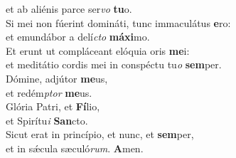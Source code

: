 \oddverse et ab aliénis parce ser\textit{vo} \textbf{tu}o.\\
\evenverse Si mei non fúerint domináti, tunc immaculátus \textbf{e}ro:~\*\\
\evenverse et emundábor a delí\textit{cto} \textbf{má}\textbf{xi}mo.\\
\oddverse Et erunt ut compláceant elóquia oris \textbf{me}i:~\*\\
\oddverse et meditátio cordis mei in conspéctu tu\textit{o} \textbf{sem}per.\\
\evenverse Dómine, adjútor \textbf{me}us,~\*\\
\evenverse et redém\textit{ptor} \textbf{me}us.\\
\oddverse Glória Patri, et \textbf{Fí}lio,~\*\\
\oddverse et Spirítu\textit{i} \textbf{San}cto.\\
\evenverse Sicut erat in princípio, et nunc, et \textbf{sem}per,~\*\\
\evenverse et in sǽcula sæculó\textit{rum}. \textbf{A}men.\\
